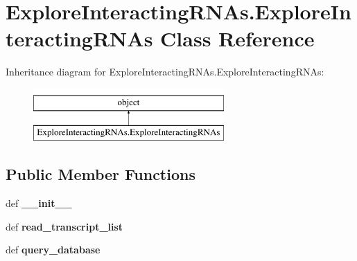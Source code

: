 \hypertarget{classExploreInteractingRNAs_1_1ExploreInteractingRNAs}{\section{Explore\-Interacting\-R\-N\-As.\-Explore\-Interacting\-R\-N\-As Class Reference}
\label{classExploreInteractingRNAs_1_1ExploreInteractingRNAs}
}
Inheritance diagram for Explore\-Interacting\-R\-N\-As.\-Explore\-Interacting\-R\-N\-As\-:\begin{figure}[H]
\begin{center}
\leavevmode
\includegraphics[height=2.000000cm]{classExploreInteractingRNAs_1_1ExploreInteractingRNAs}
\end{center}
\end{figure}
\subsection*{Public Member Functions}
\begin{DoxyCompactItemize}
\item 
\hypertarget{classExploreInteractingRNAs_1_1ExploreInteractingRNAs_a289c542fab38cbad34fc8c32dae42d8f}{def {\bfseries \-\_\-\-\_\-init\-\_\-\-\_\-}}\label{classExploreInteractingRNAs_1_1ExploreInteractingRNAs_a289c542fab38cbad34fc8c32dae42d8f}

\item 
\hypertarget{classExploreInteractingRNAs_1_1ExploreInteractingRNAs_a55c3ed4fa3a3bbb4c84c9c86e8820ec6}{def {\bfseries read\-\_\-transcript\-\_\-list}}\label{classExploreInteractingRNAs_1_1ExploreInteractingRNAs_a55c3ed4fa3a3bbb4c84c9c86e8820ec6}

\item 
\hypertarget{classExploreInteractingRNAs_1_1ExploreInteractingRNAs_a5d43c036316bfb393b5a7d828239ef50}{def {\bfseries query\-\_\-database}}\label{classExploreInteractingRNAs_1_1ExploreInteractingRNAs_a5d43c036316bfb393b5a7d828239ef50}

\end{DoxyCompactItemize}
